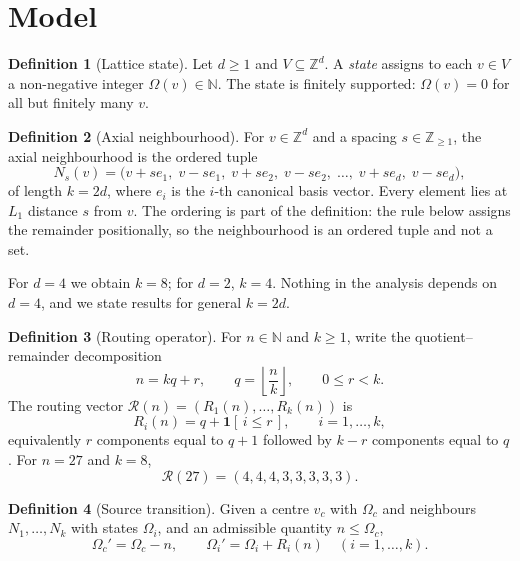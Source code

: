 \documentclass[11pt,a4paper]{article}
\theoremstyle{definition}
\newtheorem{definition}{Definition}
\newcommand{\Z}{\mathbb{Z}}
\newcommand{\N}{\mathbb{N}}
\newcommand{\R}{\mathcal{R}}
\newcommand{\Om}{\Omega}
\begin{document}
\section{Model}\label{sec:model}

\begin{definition}[Lattice state]
Let $d \geq 1$ and $V \subseteq \Z^d$. A \emph{state} assigns to each
$v \in V$ a non-negative integer $\Om(v) \in \N$. The state is finitely
supported: $\Om(v) = 0$ for all but finitely many $v$.
\end{definition}

\begin{definition}[Axial neighbourhood]
For $v \in \Z^d$ and a spacing $s \in \Z_{\geq 1}$, the axial neighbourhood is
the ordered tuple
\begin{equation}
N_s(v) = \bigl(v + s e_1,\; v - s e_1,\; v + s e_2,\; v - s e_2,\;
\ldots,\; v + s e_d,\; v - s e_d\bigr),
\end{equation}
of length $k = 2d$, where $e_i$ is the $i$-th canonical basis vector. Every
element lies at $L_1$ distance $s$ from $v$. The ordering is part of the
definition: the rule below assigns the remainder positionally, so the
neighbourhood is an ordered tuple and not a set.
\end{definition}

For $d = 4$ we obtain $k = 8$; for $d = 2$, $k = 4$. Nothing in the analysis
depends on $d = 4$, and we state results for general $k = 2d$.

\begin{definition}[Routing operator]\label{def:op}
For $n \in \N$ and $k \geq 1$, write the quotient--remainder decomposition
\begin{equation}
n = kq + r, \qquad q = \left\lfloor \frac{n}{k} \right\rfloor, \qquad
0 \leq r < k .
\end{equation}
The routing vector $\R(n) = (R_1(n), \ldots, R_k(n))$ is
\begin{equation}\label{eq:rule}
R_i(n) = q + \mathbf{1}[\,i \leq r\,], \qquad i = 1, \ldots, k ,
\end{equation}
equivalently $r$ components equal to $q+1$ followed by $k-r$ components equal
to $q$. For $n = 27$ and $k = 8$,
\begin{equation}
\R(27) = (4,4,4,3,3,3,3,3).
\end{equation}
\end{definition}

\begin{definition}[Source transition]
Given a centre $v_c$ with $\Om_c$ and neighbours $N_1, \ldots, N_k$ with states
$\Om_i$, and an admissible quantity $n \leq \Om_c$,
\begin{equation}\label{eq:transition}
\Om_c' = \Om_c - n, \qquad \Om_i' = \Om_i + R_i(n) \quad (i = 1,\ldots,k).
\end{equation}
\end{definition}
\end{document}
